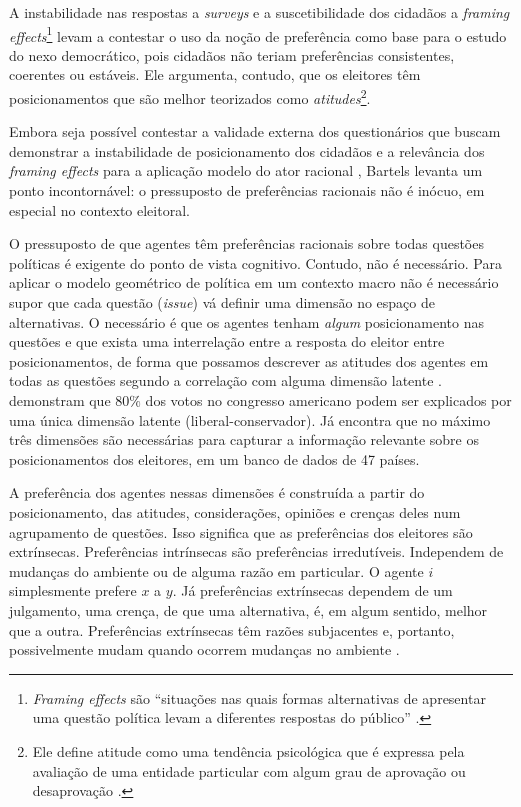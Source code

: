 A instabilidade nas respostas a \textit{surveys} e a suscetibilidade dos
cidadãos a \textit{framing effects}\footnote{\textit{Framing effects} são
  ``situações nas quais formas alternativas de apresentar uma questão política
  levam a diferentes respostas do público'' \cite[p.56]{bartels2003democracy}.}
levam  a contestar o uso da noção de
preferência como base para o estudo do nexo democrático, pois cidadãos não
teriam preferências consistentes, coerentes ou estáveis. Ele argumenta, contudo,
que os eleitores têm posicionamentos que são melhor teorizados como
\textit{atitudes}\footnote{ Ele define atitude como uma tendência psicológica
  que é expressa pela avaliação de uma entidade particular com algum grau de
  aprovação ou desaprovação \cite[p.52]{bartels2003democracy}.}.

Embora seja possível contestar a validade externa dos questionários que buscam
demonstrar a instabilidade de posicionamento dos cidadãos
\cite{druckman2012public} e a relevância dos \textit{framing effects} para a
aplicação modelo do ator racional \cite[p. 107]{gintis2016individuality},
Bartels levanta um ponto incontornável: o pressuposto de preferências racionais
não é inócuo, em especial no contexto eleitoral.

O pressuposto de que agentes têm preferências racionais sobre todas questões
políticas é exigente do ponto de vista cognitivo. Contudo, não é necessário.
Para aplicar o modelo geométrico de política em um contexto macro não é
necessário supor que cada questão (\textit{issue}) vá definir uma dimensão no
espaço de alternativas. O necessário é que os agentes tenham \textit{algum}
posicionamento nas questões e que exista uma interrelação entre a resposta do
eleitor entre posicionamentos, de forma que possamos descrever as atitudes dos
agentes em todas as questões segundo a correlação com alguma dimensão latente
\cite{poole2005spatial,laver2014measuring}. 
demonstram que $80\%$ dos votos no congresso americano podem ser explicados por
uma única dimensão latente (liberal-conservador). Já
 encontra que no máximo três dimensões são
necessárias para capturar a informação relevante sobre os posicionamentos dos
eleitores, em um banco de dados de 47 países.

A preferência dos agentes nessas dimensões é construída a partir do
posicionamento, das atitudes, considerações, opiniões e crenças deles num
agrupamento de questões. Isso significa que as preferências dos eleitores são
extrínsecas. Preferências intrínsecas são preferências irredutíveis. Independem
de mudanças do ambiente ou de alguma razão em particular. O agente \(i\)
simplesmente prefere \(x\) a \(y\). Já preferências extrínsecas dependem de um
julgamento, uma crença, de que uma alternativa, é, em algum sentido, melhor que
a outra. Preferências extrínsecas têm razões subjacentes e, portanto,
possivelmente mudam quando ocorrem mudanças no ambiente \cite{liu2010wright,
  binmore2008rational}.

